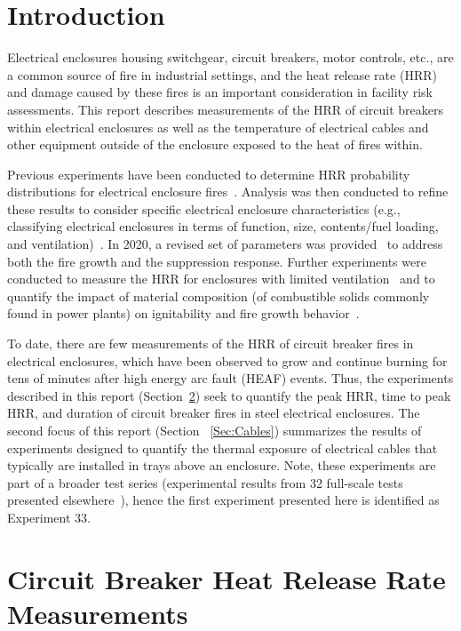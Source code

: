\section{Introduction}

Electrical enclosures housing switchgear, circuit breakers, motor controls, etc., are a common source of fire in industrial settings, and the heat release rate (HRR) and damage caused by these fires is an important consideration in facility risk assessments. This report describes measurements of the HRR of circuit breakers within electrical enclosures as well as the temperature of electrical cables and other equipment outside of the enclosure exposed to the heat of fires within.

Previous experiments have been conducted to determine HRR probability distributions for electrical enclosure fires~\cite{NUREG/CR-7197}. Analysis was then conducted to refine these results to consider specific electrical enclosure characteristics (e.g., classifying electrical enclosures in terms of function, size, contents/fuel loading, and ventilation)~\cite{NUREG-2178}. In 2020, a revised set of parameters was provided~\cite{NUREG2230} to address both the fire growth and the suppression response. Further experiments were conducted to measure the HRR for enclosures with limited ventilation~\cite{OLIVE-FIRE} and to quantify the impact of material composition (of combustible solids commonly found in power plants) on ignitability and fire growth behavior~\cite{leventon2024nist}. 

To date, there are few measurements of the HRR of circuit breaker fires in electrical enclosures, which have been observed to grow and continue burning for tens of minutes after high energy arc fault (HEAF) events. Thus, the experiments described in this report (Section~\ref{Sec:Circuit Breakers}) seek to quantify the peak HRR, time to peak HRR, and duration of circuit breaker fires in steel electrical enclosures. The second focus of this report (Section~ \ref{Sec:Cables}) summarizes the results of experiments designed to quantify the thermal exposure of electrical cables that typically are installed in trays above an enclosure. Note, these experiments are part of a broader test series (experimental results from 32 full-scale tests presented elsewhere~\cite{OLIVE-FIRE}), hence the first experiment presented here is identified as Experiment 33.


\clearpage

\section{Circuit Breaker Heat Release Rate Measurements}
\label{Sec:Circuit Breakers}

